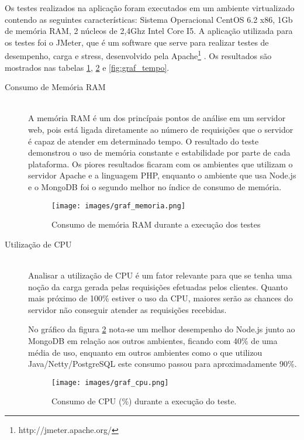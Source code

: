 Os testes realizados na aplicação foram executados em um ambiente virtualizado contendo as seguintes características: Sistema Operacional CentOS 6.2 x86, 1Gb de memória RAM, 2 núcleos de 2,4Ghz Intel Core I5. A aplicação utilizada para os testes foi o JMeter, que é um software que serve para realizar testes de desempenho, carga e stress, desenvolvido pela Apache\footnote{http://jmeter.apache.org/} . Os resultados são mostrados nas tabelas \ref{fig:graf_memoria}, \ref{fig:graf_cpu} e \ref{fig:graf_tempo}.
\clearpage
\begin{description}
\item[Consumo de Memória RAM] \hfill \\
A memória RAM é um dos princípais pontos de análise em um servidor web, pois está ligada diretamente ao número de requisições que o servidor é capaz de atender em determinado tempo.\cite{NodejsEMongodb}
O resultado do teste demonstrou o uso de memória constante e estabilidade por parte de cada plataforma. Os piores resultados ficaram com os ambientes que utilizam o servidor Apache e a linguagem PHP, enquanto o ambiente que usa Node.js e o MongoDB foi o segundo melhor no índice de consumo de memória.

\begin{figure}[htb!]
\centering
\texttt{[image: images/graf\_memoria.png]}
\caption{Consumo de memória RAM durante a execução dos testes \cite{NodejsEMongodb}}
\label{fig:graf_memoria}
\end{figure}

\clearpage
 
\item[Utilização de CPU] \hfill \\
Analisar a utilização de CPU é um fator relevante para que se tenha uma noção da carga gerada pelas requisições efetuadas pelos clientes. Quanto mais próximo de 100\% estiver o uso da CPU, maiores serão as chances do servidor não conseguir atender as requisições recebidas. 

No gráfico da figura \ref{fig:graf_cpu} nota-se um melhor desempenho do Node.js junto ao MongoDB em relação aos outros ambientes, ficando com 40\% de uma média de uso, enquanto em outros ambientes como o que utilizou Java/Netty/PostgreSQL este consumo passou para aproximadamente 90\%.

\begin{figure}[htb]
\centering
\texttt{[image: images/graf\_cpu.png]}
\caption{Consumo de CPU (\%) durante a execução do teste. \cite{NodejsEMongodb}}
\label{fig:graf_cpu}
\end{figure}


\end{description}
